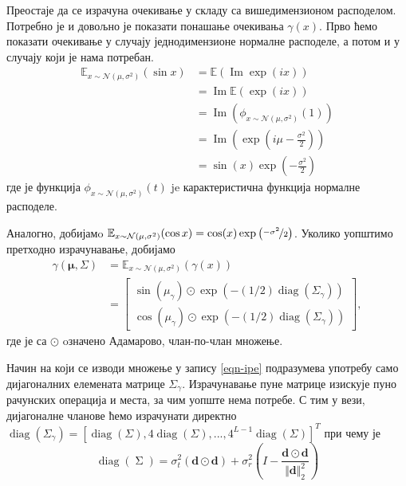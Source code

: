 \documentclass[12pt, a4paper, twoside]{book}
\numberwithin{equation}{chapter}
\numberwithin{theorem}{section}
\numberwithin{definition}{section}
\numberwithin{definitionChapter}{chapter}
\begin{document}
Преостаје да се израчуна очекивање у складу са вишедимензионом расподелом. Потребно је и довољно је показати
понашање очекивања $\gamma(x)$. Прво ћемо показати очекивање у случају једнодимензионе нормалне расподеле, а
потом и у случају који је нама потребан.
\begin{equation}
	\begin{split}
		\mathbb{E}_{x \sim \mathcal{N}(\mu, \sigma^2)}(\sin x) & = \mathbb{E}(\operatorname{Im}\exp(ix)) \\
			& = \operatorname{Im}\mathbb{E}(\exp(ix)) \\
			& = \operatorname{Im}(\phi_{x \sim \mathcal{N}(\mu, \sigma^2)}(1)) \\
			& = \operatorname{Im}\left(\exp\left(i\mu - \frac{\sigma^2}{2}\right)\right) \\
			& = \sin(x)\exp\left(-\frac{\sigma^2}{2}\right)
	\end{split}
\end{equation}
где је функција $\phi_{x \sim \mathcal{N}(\mu, \sigma^2)}(t)$ je карактеристична функција нормалне расподеле.

Аналогно, добијамo $\mathbb{E}_{x \sim \mathcal{N}(\mu, \sigma^2)}(\cos x) = \cos(x)\exp\left(\nicefrac{-\sigma^2}{2}\right)$.
Уколико уопштимо претходно израчунавање, добијамо
\begin{equation}
	\begin{split}
		\gamma(\boldsymbol{\mu}, \Sigma) & = \mathbb{E}_{x \sim \mathcal{N}(\mu, \sigma^2)}(\gamma(x)) \\
			& =
			\begin{bmatrix}
				\sin(\mu_\gamma) \odot \exp(-(1/2)\operatorname{diag}(\Sigma_\gamma)) \\
				\cos(\mu_\gamma) \odot \exp(-(1/2)\operatorname{diag}(\Sigma_\gamma))
			\end{bmatrix},
		\label{eqn-ipe}
	\end{split}
\end{equation}
где је са $\odot$ oзначено Адамарово, члан-по-члан множење.

Начин на који се изводи множење у запису \ref{eqn-ipe} подразумева употребу само дијагоналних елемената матрице
$\Sigma_\gamma$. Израчунавање пуне матрице изискује пуно рачунских операција и места, за чим уопште нема потребе.
С тим у вези, дијагоналне чланове ћемо израчунати директно $\operatorname{diag}(\Sigma_\gamma)
= \left[\operatorname{diag}(\Sigma), 4\operatorname{diag}(\Sigma), ..., 4^{L-1}\operatorname{diag}(\Sigma)\right]^T$ при чему је
\begin{equation}
	\operatorname{diag}(\operatorname{\Sigma}) = \sigma_t^2(\mathbf{d}\odot\mathbf{d}) +
		\sigma_r^2\left(I - \frac{\mathbf{d} \odot \mathbf{d}}{\Vert\mathbf{d}\Vert_2^2}\right)
\end{equation}
\end{document}

